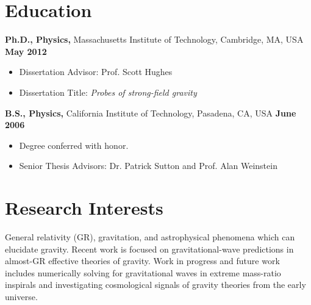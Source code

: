 \documentclass[margin,line]{res}
\begin{document}
\newcommand{\myname}{Leo C. Stein}
\newlength{\mynamewidth}
\settowidth{\mynamewidth}{\namefont\myname}

\name{\hspace*{0.5\textwidth}\hspace{-0.5\mynamewidth} \myname \vspace*{.1in}}
\thispagestyle{empty}

\begin{resume}



\section{\sc Education}
{\bf Ph.D., Physics,} Massachusetts Institute of Technology, Cambridge, MA, USA \hfill {\bf May 2012}\\
\vspace*{-.1in}
\begin{itemize}
\item[ ] Dissertation Advisor: Prof. Scott Hughes
\item[ ] Dissertation Title: {\it Probes of strong-field gravity}
\end{itemize}

{\bf B.S., Physics,} California Institute of
Technology, Pasadena, CA, USA \hfill {\bf June 2006}\\
\vspace*{-.1in}
\begin{itemize}
\item[ ] Degree conferred with honor.
\item[ ] Senior Thesis Advisors: Dr. Patrick Sutton and Prof. Alan Weinstein
\end{itemize}

\section{\sc Research Interests}
General relativity (GR), gravitation, and astrophysical phenomena which can
elucidate gravity. Recent work is focused on gravitational-wave predictions
in almost-GR effective theories of gravity. Work in progress and
future work includes numerically solving for gravitational waves in
extreme mass-ratio inspirals and investigating cosmological
signals of gravity theories from the early universe.


\end{resume}
\end{document}
